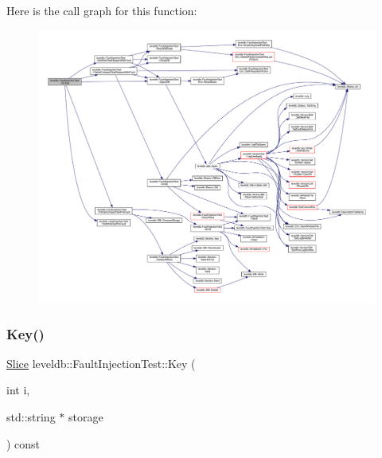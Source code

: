 Here is the call graph for this function\+:
\nopagebreak
\begin{figure}[H]
\begin{center}
\leavevmode
\includegraphics[width=350pt]{classleveldb_1_1_fault_injection_test_a451539e9d3eb1ba9e9f68cca5a774cdc_cgraph}
\end{center}
\end{figure}
\mbox{\label{classleveldb_1_1_fault_injection_test_ab2599d1e090f74b7294715c8d676ff12}} 
\subsubsection{\texorpdfstring{Key()}{Key()}}
{\footnotesize\ttfamily \mbox{\hyperlink{classleveldb_1_1_slice}{Slice}} leveldb\+::\+Fault\+Injection\+Test\+::\+Key (\begin{DoxyParamCaption}\item[{int}]{i,  }\item[{std\+::string $\ast$}]{storage }\end{DoxyParamCaption}) const\hspace{0.3cm}{\ttfamily [inline]}}

